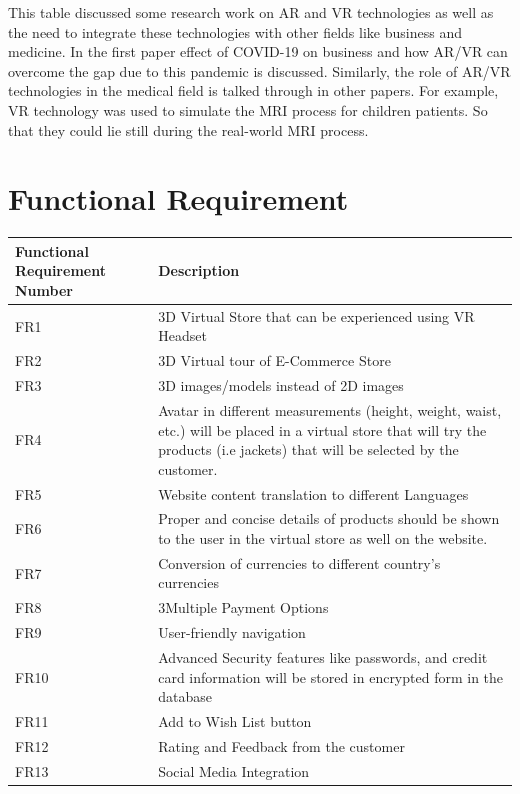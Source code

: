This table discussed some research work on AR and VR technologies as well as the need to integrate these technologies with other fields like business and medicine. In the first paper effect of COVID-19 on business and how AR/VR can overcome the gap due to this pandemic is discussed. Similarly, the role of AR/VR technologies in the medical field is talked through in other papers. For example, VR technology was used to simulate the MRI process for children patients. So that they could lie still during the real-world MRI process.
\section{Functional Requirement}
      \begin{table}[H]
          \centering
         \begin{tabular}{ | m{8em} | m{10cm} | } 
 \hline
 \textbf{Functional Requirement Number} & \textbf{Description}  \\  \hline
           FR1 & 3D Virtual Store that can be experienced using VR Headset
         \\  \hline
           FR2 & 3D Virtual tour of E-Commerce Store
\\           \hline
           FR3 & 3D images/models instead of 2D images
        \\   \hline
           FR4 & Avatar in different measurements (height, weight, waist, etc.)  will be placed in a virtual store that will try the products (i.e jackets) that will be selected by the customer.
     \\      \hline
           FR5 & Website content translation to different Languages
     \\      \hline FR6 & Proper and concise details of products should be shown to the user in the virtual store as well on the website.
    \\       \hline FR7 & Conversion of currencies to different country’s currencies
    \\       \hline FR8 & 3Multiple Payment Options
       \\    \hline FR9 & User-friendly navigation
         \\  \hline FR10 & Advanced Security features like passwords, and credit card information will be stored in encrypted form in the database
         \\  \hline FR11 & Add to Wish List button
          \\ \hline FR12 & Rating and Feedback from the customer
          \\  \hline FR13 & Social Media Integration

\end{tabular}
\end{table}
